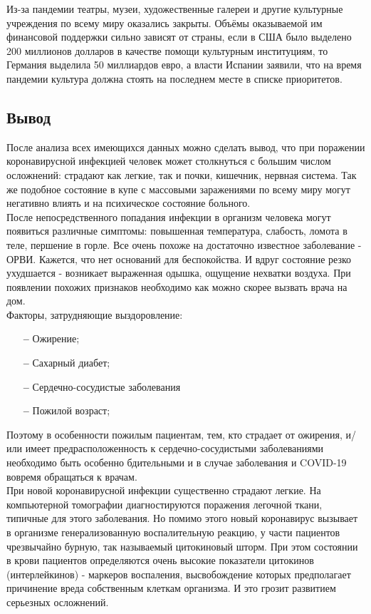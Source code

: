 \documentclass[a4paper, 12pt]{extarticle}
\begin{document}
Из-за пандемии театры, музеи, художественные галереи и другие культурные
учреждения по всему миру оказались закрыты. Объёмы оказываемой им финансовой
поддержки сильно зависят от страны, если в США было выделено 200 миллионов
долларов в качестве помощи культурным институциям, то Германия выделила 50
миллиардов евро, а власти Испании заявили, что на время пандемии культура
должна стоять на последнем месте в списке приоритетов.
\newpage

\subsection{Вывод}
После анализа всех имеющихся данных можно сделать вывод, что
при поражении коронавирусной инфекцией человек может столкнуться с большим числом
осложнений: страдают как легкие, так и почки, кишечник, нервная система. Так же
подобное состояние в купе с массовыми заражениями по всему миру могут негативно
влиять и на психическое состояние больного.
\\

После непосредственного попадания инфекции в организм человека могут появиться
различные симптомы: повышенная температура, слабость, ломота в теле, першение в горле.
Все очень похоже на достаточно известное заболевание - ОРВИ. Кажется, что нет
оснований для беспокойства. И вдруг состояние резко ухудшается - возникает
выраженная одышка, ощущение нехватки воздуха. При появлении похожих признаков
необходимо как можно скорее вызвать врача на дом.
\\

Факторы, затрудняющие выздоровление:
\begin{itemize}
    \item[\bfseries--] Ожирение;
    \item[\bfseries--] Сахарный диабет;
    \item[\bfseries--] Сердечно-сосудистые заболевания
    \item[\bfseries--] Пожилой возраст;
\end{itemize}

Поэтому в особенности пожилым пациентам, тем, кто страдает от ожирения, и/или имеет
предрасположенность к сердечно-сосудистыми заболеваниями необходимо быть
особенно бдительными и в случае заболевания и COVID-19 вовремя обращаться к
врачам.
\\

При новой коронавирусной инфекции существенно страдают легкие. На компьютерной
томографии диагностируются поражения легочной ткани, типичные для этого
заболевания. Но помимо этого новый коронавирус вызывает в организме
генерализованную воспалительную реакцию, у части пациентов чрезвычайно бурную,
так называемый цитокиновый шторм. При этом состоянии в крови пациентов
определяются очень высокие показатели цитокинов (интерлейкинов) - маркеров
воспаления, высвобождение которых предполагает причинение вреда собственным
клеткам организма. И это грозит развитием серьезных осложнений.
\\
\end{document}

